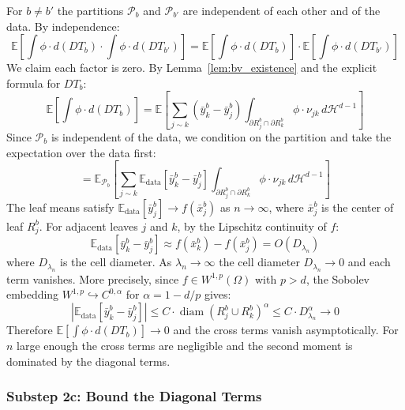 \documentclass[12pt]{article}
\newcommand{\E}{\mathbb{E}}
\newcommand{\Wonep}{W^{1,p}(\Omega)}
\begin{document}
	For $b \neq b'$ the partitions $\mathcal{P}_b$ and $\mathcal{P}_{b'}$ are
	independent of each other and of the data. By independence:
	\begin{equation}
		\E\!\left[\int \phi \cdot d(DT_b) \cdot \int \phi \cdot d(DT_{b'})\right]
		= \E\!\left[\int \phi \cdot d(DT_b)\right] \cdot
		\E\!\left[\int \phi \cdot d(DT_{b'})\right]
	\end{equation}
	We claim each factor is zero. By Lemma~\ref{lem:bv_existence} and the
	explicit formula for $DT_b$:
	\begin{equation}
		\E\!\left[\int \phi \cdot d(DT_b)\right]
		= \E\!\left[\sum_{j \sim k}
		(\bar{y}_k^b - \bar{y}_j^b)
		\int_{\partial R_j^b \cap \partial R_k^b} \phi \cdot \nu_{jk}
		\, d\mathcal{H}^{d-1}\right]
	\end{equation}
	Since $\mathcal{P}_b$ is independent of the data, we condition on the
	partition and take the expectation over the data first:
	\begin{equation}
		= \mathbb{E}_{\mathcal{P}_b}\!\left[\sum_{j \sim k}
		\mathbb{E}_{\mathrm{data}}\!\left[\bar{y}_k^b - \bar{y}_j^b\right]
		\int_{\partial R_j^b \cap \partial R_k^b} \phi \cdot \nu_{jk}
		\, d\mathcal{H}^{d-1}\right]
	\end{equation}
	The leaf means satisfy $\mathbb{E}_{\mathrm{data}}[\bar{y}_j^b] \to f(\bar{x}_j^b)$
	as $n \to \infty$, where $\bar{x}_j^b$ is the center of leaf $R_j^b$. For
	adjacent leaves $j$ and $k$, by the Lipschitz continuity of $f$:
	\begin{equation}
		\mathbb{E}_{\mathrm{data}}\!\left[\bar{y}_k^b - \bar{y}_j^b\right]
		\approx f(\bar{x}_k^b) - f(\bar{x}_j^b) = O(D_{\lambda_n})
	\end{equation}
	where $D_{\lambda_n}$ is the cell diameter. As $\lambda_n \to \infty$ the
	cell diameter $D_{\lambda_n} \to 0$ and each term vanishes. More precisely,
	since $f \in \Wonep$ with $p > d$, the Sobolev embedding
	$W^{1,p} \hookrightarrow C^{0,\alpha}$ for $\alpha = 1 - d/p$ gives:
	\begin{equation}
		\left|\mathbb{E}_{\mathrm{data}}\!\left[\bar{y}_k^b - \bar{y}_j^b\right]\right|
		\leq C \cdot \operatorname{diam}(R_j^b \cup R_k^b)^\alpha
		\leq C \cdot D_{\lambda_n}^\alpha \to 0
	\end{equation}
	Therefore $\mathbb{E}[\int \phi \cdot d(DT_b)] \to 0$ and the cross terms
	vanish asymptotically. For $n$ large enough the cross terms are negligible
	and the second moment is dominated by the diagonal terms.
	
	\subsubsection*{Substep 2c: Bound the Diagonal Terms}
	
\end{document}
